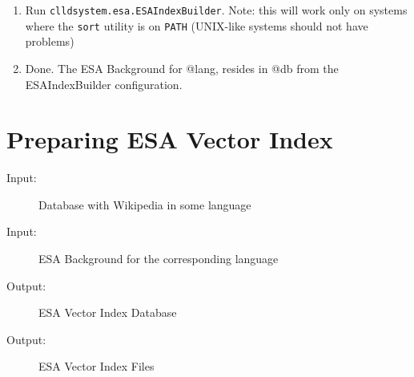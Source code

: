 \documentclass{article}
\begin{document}
\begin{enumerate}
\item Run \verb|clldsystem.esa.ESAIndexBuilder|. Note: this will work only on systems where the \texttt{sort} utility is on \texttt{PATH} (UNIX-like systems should not have problems)

\item Done. The ESA Background for @lang, resides in @db from the ESAIndexBuilder configuration.
\end{enumerate}


\section*{Preparing ESA Vector Index}
\begin{description}
\item[Input:] Database with Wikipedia in some language
\item[Input:] ESA Background for the corresponding language
\item[Output:] ESA Vector Index Database
\item[Output:] ESA Vector Index Files
\end{description}
\end{document}
